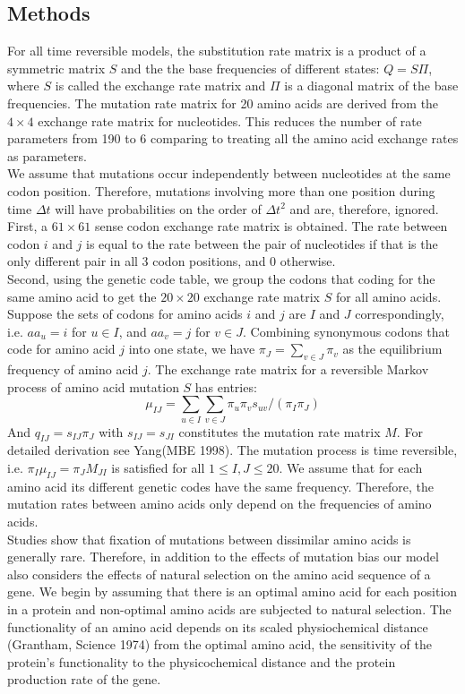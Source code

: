\documentclass[13pt]{article}
\begin{document}
\subsection{Methods}
For all time reversible models, the substitution rate matrix is a product of a symmetric matrix $S$ and the the base frequencies of different states: $Q = S\Pi$, where $S$ is called the exchange rate matrix and $\Pi$ is a diagonal matrix of the base frequencies.
The mutation rate matrix for 20 amino acids are derived from the $4 \times 4 $ exchange rate matrix for nucleotides.
This reduces the number of rate parameters from 190 to 6 comparing to treating all the amino acid exchange rates as parameters.\\

We assume that mutations occur independently between nucleotides at the same codon position.
Therefore, mutations involving more than one position during time $\Delta t$ will have probabilities on the order of $\Delta t^2$ and are, therefore, ignored.
First, a $61 \times 61$ sense codon exchange rate matrix is obtained.
The rate between codon $i$ and $j$ is equal to the rate between the pair of nucleotides if that is the only different pair in all 3 codon positions, and 0 otherwise.\\


Second, using the genetic code table, we group the codons that coding for the same amino acid to get the $20 \times 20$ exchange rate matrix $S$ for all amino acids.
Suppose the sets of codons for amino acids $i$ and $j$ are $I$ and $J$ correspondingly, i.e. $aa_u = i$ for $u \in I$, and $aa_v = j$ for $v \in J$.
Combining synonymous codons that code for amino acid $j$ into one state, we have $\pi_J = \sum_{v \in J} \pi_v$ as the equilibrium frequency of amino acid $j$.
The exchange rate matrix for a reversible Markov process of amino acid mutation $S$ has entries:
\[\mu_{IJ} = \sum_{u \in I} \sum_{v \in J} \pi_u \pi_v s_{uv} / (\pi_I \pi_J)\]
\noindent
And $q_{IJ} = s_{IJ} \pi_J$ with $s_{IJ}  = s_{JI}$ constitutes the mutation rate matrix $M$.
For detailed derivation see Yang(MBE 1998).
The mutation process is time reversible, i.e. $\pi_I \mu_{IJ} = \pi_J M_{JI}$ is satisfied for all $1 \leq I,J \leq 20$.
We assume that for each amino acid its different genetic codes have the same frequency.
Therefore, the mutation rates between amino acids only depend on the frequencies of amino acids. \\

Studies show that fixation of mutations between dissimilar amino acids is generally rare.
Therefore, in addition to the effects of mutation bias our model also considers the effects of natural selection on the amino acid sequence of a gene.
We begin by assuming that there is an optimal amino acid for each position in a protein and non-optimal amino acids are subjected to natural selection.
The functionality of an amino acid depends on its scaled physiochemical distance (Grantham, Science 1974) from the optimal amino acid, the sensitivity of the protein's functionality to the physicochemical distance and the protein production rate of the gene. \\
\end{document}
